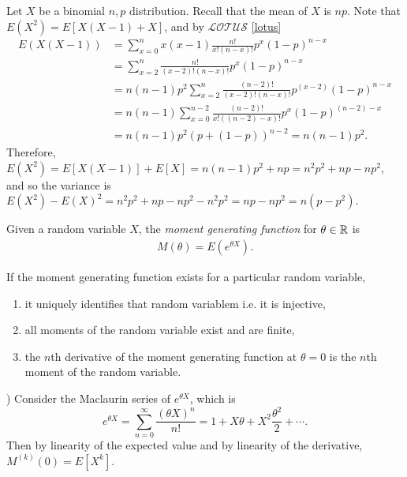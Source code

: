 \begin{exmp}
    Let $X$ be a binomial $n, p$ distribution. Recall that the mean of $X$ is $np$. Note that $E(X^2) = E[X(X-1)+X]$, and by $\mathcal{LOTUS}$ \ref{lotus}
    \begin{align*}
        E(X(X-1)) &= \sum_{x=0}^{n}x(x-1)\frac{n!}{x!(n-x)!}p^x(1-p)^{n-x} \\
        &= \sum_{x=2}^{n}\frac{n!}{(x-2)!(n-x)!}p^x(1-p)^{n-x} \\
        &= n(n-1)p^2\sum_{x=2}^{n}\frac{(n-2)!}{(x-2)!(n-x)!}p^{(x-2)}(1-p)^{n-x} \\
        &= n(n-1)\sum_{x=0}^{n-2}\frac{(n-2)!}{x!((n-2)-x)!}p^x(1-p)^{(n-2)-x} \\
        &= n(n-1)p^2\left(p+(1-p)\right)^{n-2} = n(n-1)p^2.
    \end{align*}
    Therefore, $E(X^2) = E[X(X-1)]+E[X]=n(n-1)p^2+np = n^2p^2+np-np^2$, and so the variance is $E(X^2)-E(X)^2 = n^2p^2+np-np^2-n^2p^2 = np-np^2 = n(p-p^2)$.
\end{exmp}

\begin{defn}
    Given a random variable $X$, the \emph{moment generating function} for $\theta \in \mathbb{R}$ is
    \begin{align*}
        M(\theta) = E(e^{\theta X}).
    \end{align*}
\end{defn}

\begin{prop}
    If the moment generating function exists for a particular random variable,
    \begin{enumerate}
        \item it uniquely identifies that random variablem i.e. it is injective,
        \item all moments of the random variable exist and are finite,
        \item the $n$th derivative of the moment generating function at $\theta = 0$ is the $n$th moment of the random variable.
    \end{enumerate}
\end{prop}

\begin{prop}) Consider the Maclaurin series of $e^{\theta X}$, which is
    \[e^{\theta X} = \sum_{n=0}^{\infty}\frac{(\theta X)^n}{n!} = 1 + X\theta + X^2\frac{\theta^2}{2} + \cdots.\]
    Then by linearity of the expected value and by linearity of the derivative, $M^{(k)}(0) = E\left[X^k\right]$.
\end{prop}

